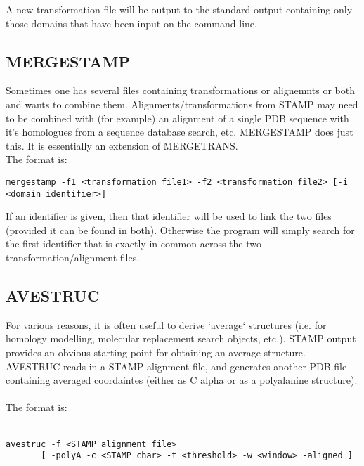 A new transformation file will be output to the standard output containing only those domains
that have been input on the command line.

\subsection{MERGESTAMP}

Sometimes one has several files containing transformations or alignemnts or both
and wants to combine them.  Alignments/transformations from STAMP may need to be
combined with (for example) an alignment of a single PDB sequence with it's homologues
from a sequence database search, etc.  MERGESTAMP does just this.  It is essentially
an extension of MERGETRANS.\\

The format is:\\

\begin{scriptsize}\begin{verbatim}
mergestamp -f1 <transformation file1> -f2 <transformation file2> [-i <domain identifier>]
\end{verbatim} \end{scriptsize}

If an identifier is given, then that identifier will be used to link the two files (provided it
can be found in both).   Otherwise the program will simply search for the first identifier that 
is exactly in common across the two transformation/alignment files.

\subsection{AVESTRUC}

For various reasons, it is often useful to derive `average`
structures (i.e. for homology modelling, molecular replacement
search objects, etc.).  STAMP output provides an obvious starting
point for obtaining an average structure.  AVESTRUC reads in a
STAMP alignment file, and generates another PDB file containing
averaged coordaintes (either as C alpha or as a polyalanine 
structure).\\
\\
The format is:\\
\\
\begin{scriptsize}\begin{verbatim}
avestruc -f <STAMP alignment file> 
       [ -polyA -c <STAMP char> -t <threshold> -w <window> -aligned ]
\end{verbatim} \end{scriptsize}

